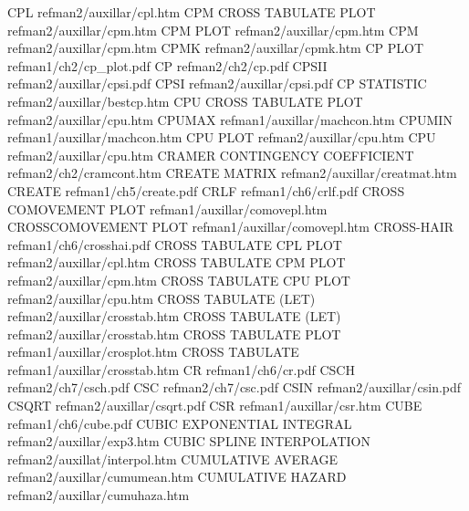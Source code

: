 CPL                                     refman2/auxillar/cpl.htm
CPM CROSS TABULATE PLOT                 refman2/auxillar/cpm.htm
CPM PLOT                                refman2/auxillar/cpm.htm
CPM                                     refman2/auxillar/cpm.htm
CPMK                                    refman2/auxillar/cpmk.htm
CP PLOT                                 refman1/ch2/cp_plot.pdf
CP                                      refman2/ch2/cp.pdf
CPSII                                   refman2/auxillar/cpsi.pdf
CPSI                                    refman2/auxillar/cpsi.pdf
CP STATISTIC                            refman2/auxillar/bestcp.htm
CPU CROSS TABULATE PLOT                 refman2/auxillar/cpu.htm
CPUMAX                                  refman1/auxillar/machcon.htm
CPUMIN                                  refman1/auxillar/machcon.htm
CPU PLOT                                refman2/auxillar/cpu.htm
CPU                                     refman2/auxillar/cpu.htm
CRAMER CONTINGENCY COEFFICIENT          refman2/ch2/cramcont.htm
CREATE MATRIX                           refman2/auxillar/creatmat.htm
CREATE                                  refman1/ch5/create.pdf
CRLF                                    refman1/ch6/crlf.pdf
CROSS COMOVEMENT PLOT                   refman1/auxillar/comovepl.htm
CROSSCOMOVEMENT PLOT                    refman1/auxillar/comovepl.htm
CROSS-HAIR                              refman1/ch6/crosshai.pdf
CROSS TABULATE CPL PLOT                 refman2/auxillar/cpl.htm
CROSS TABULATE CPM PLOT                 refman2/auxillar/cpm.htm
CROSS TABULATE CPU PLOT                 refman2/auxillar/cpu.htm
CROSS TABULATE (LET)                    refman2/auxillar/crosstab.htm
CROSS TABULATE (LET)                    refman2/auxillar/crosstab.htm
CROSS TABULATE PLOT                     refman1/auxillar/crosplot.htm
CROSS TABULATE                          refman1/auxillar/crosstab.htm
CR                                      refman1/ch6/cr.pdf
CSCH                                    refman2/ch7/csch.pdf
CSC                                     refman2/ch7/csc.pdf
CSIN                                    refman2/auxillar/csin.pdf
CSQRT                                   refman2/auxillar/csqrt.pdf
CSR                                     refman1/auxillar/csr.htm
CUBE                                    refman1/ch6/cube.pdf
CUBIC EXPONENTIAL INTEGRAL              refman2/auxillar/exp3.htm
CUBIC SPLINE INTERPOLATION              refman2/auxillat/interpol.htm
CUMULATIVE AVERAGE                      refman2/auxillar/cumumean.htm
CUMULATIVE HAZARD                       refman2/auxillar/cumuhaza.htm
